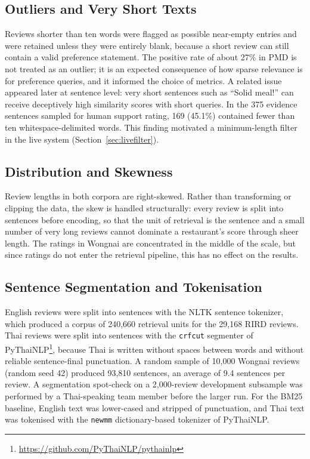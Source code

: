 \subsection{Outliers and Very Short Texts}
\label{sec:outliers}

Reviews shorter than ten words were flagged as possible near-empty entries and were retained unless they were entirely blank, because a short review can still contain a valid preference statement. The positive rate of about 27\% in PMD is not treated as an outlier; it is an expected consequence of how sparse relevance is for preference queries, and it informed the choice of metrics. A related issue appeared later at sentence level: very short sentences such as ``Solid meal!'' can receive deceptively high similarity scores with short queries. In the 375 evidence sentences sampled for human support rating, 169 (45.1\%) contained fewer than ten whitespace-delimited words. This finding motivated a minimum-length filter in the live system (Section~\ref{sec:livefilter}).

\subsection{Distribution and Skewness}
\label{sec:skew}

Review lengths in both corpora are right-skewed. Rather than transforming or clipping the data, the skew is handled structurally: every review is split into sentences before encoding, so that the unit of retrieval is the sentence and a small number of very long reviews cannot dominate a restaurant's score through sheer length. The ratings in Wongnai are concentrated in the middle of the scale, but since ratings do not enter the retrieval pipeline, this has no effect on the results.

\subsection{Sentence Segmentation and Tokenisation}
\label{sec:segmentation}

English reviews were split into sentences with the NLTK sentence tokenizer, which produced a corpus of 240,660 retrieval units for the 29,168 RIRD reviews. Thai reviews were split into sentences with the \texttt{crfcut} segmenter of PyThaiNLP\footnote{\url{https://github.com/PyThaiNLP/pythainlp}}, because Thai is written without spaces between words and without reliable sentence-final punctuation. A random sample of 10,000 Wongnai reviews (random seed 42) produced 93,810 sentences, an average of 9.4 sentences per review. A segmentation spot-check on a 2,000-review development subsample was performed by a Thai-speaking team member before the larger run. For the BM25 baseline, English text was lower-cased and stripped of punctuation, and Thai text was tokenised with the \texttt{newmm} dictionary-based tokenizer of PyThaiNLP.

